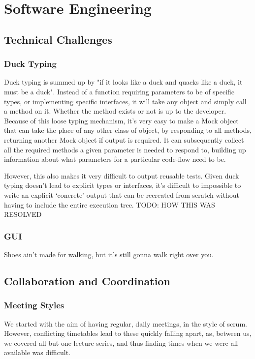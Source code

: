 \chapter{Software Engineering}
\section{Technical Challenges}
  \subsection{Duck Typing}
    Duck typing is summed up by "if it looks like a duck and quacks like a duck, it must be a duck".
    Instead of a function requiring parameters to be of specific types, or implementing specific interfaces, it will take any object and simply call a method on it.
    Whether the method exists or not is up to the developer.
    Because of this loose typing mechanism, it's very easy to make a Mock object that can take the place of any other class of object, by responding to all methods, returning another Mock object if output is required.
    It can subsequently collect all the required methods a given parameter is needed to respond to, building up information about what parameters for a particular code-flow need to be.

    However, this also makes it very difficult to output reusable tests.
    Given duck typing doesn't lead to explicit types or interfaces, it's difficult to impossible to write an explicit `concrete' output that can be recreated from scratch without having to include the entire execution tree.
    TODO: HOW THIS WAS RESOLVED

  \subsection{GUI}
    Shoes ain't made for walking, but it's still gonna walk right over you.

\section{Collaboration and Coordination}

  \subsection{Meeting Styles}
    We started with the aim of having regular, daily meetings, in the style of scrum.
    However, conflicting timetables lead to these quickly falling apart, as, between us, we covered all but one lecture series, and thus finding times when we were all available was difficult.

